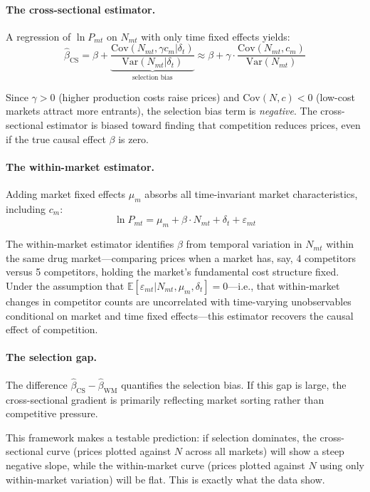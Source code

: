 \documentclass[12pt]{article}
\newcommand{\E}{\mathbb{E}}
\newcommand{\Var}{\text{Var}}
\newcommand{\Cov}{\text{Cov}}
\begin{document}
\paragraph{The cross-sectional estimator.} A regression of $\ln P_{mt}$ on $N_{mt}$ with only time fixed effects yields:
\begin{equation}\label{eq:cross}
\hat{\beta}_{\text{CS}} = \beta + \underbrace{\frac{\Cov(N_{mt}, \gamma c_m | \delta_t)}{\Var(N_{mt} | \delta_t)}}_{\text{selection bias}} \approx \beta + \gamma \cdot \frac{\Cov(N_{mt}, c_m)}{\Var(N_{mt})}
\end{equation}

Since $\gamma > 0$ (higher production costs raise prices) and $\Cov(N, c) < 0$ (low-cost markets attract more entrants), the selection bias term is \emph{negative}. The cross-sectional estimator is biased toward finding that competition reduces prices, even if the true causal effect $\beta$ is zero.

\paragraph{The within-market estimator.} Adding market fixed effects $\mu_m$ absorbs all time-invariant market characteristics, including $c_m$:
\begin{equation}\label{eq:within}
\ln P_{mt} = \mu_m + \beta \cdot N_{mt} + \delta_t + \varepsilon_{mt}
\end{equation}

The within-market estimator identifies $\beta$ from temporal variation in $N_{mt}$ within the same drug market---comparing prices when a market has, say, 4 competitors versus 5 competitors, holding the market's fundamental cost structure fixed. Under the assumption that $\E[\varepsilon_{mt} | N_{mt}, \mu_m, \delta_t] = 0$---i.e., that within-market changes in competitor counts are uncorrelated with time-varying unobservables conditional on market and time fixed effects---this estimator recovers the causal effect of competition.

\paragraph{The selection gap.} The difference $\hat{\beta}_{\text{CS}} - \hat{\beta}_{\text{WM}}$ quantifies the selection bias. If this gap is large, the cross-sectional gradient is primarily reflecting market sorting rather than competitive pressure.

This framework makes a testable prediction: if selection dominates, the cross-sectional curve (prices plotted against $N$ across all markets) will show a steep negative slope, while the within-market curve (prices plotted against $N$ using only within-market variation) will be flat. This is exactly what the data show.
\end{document}
